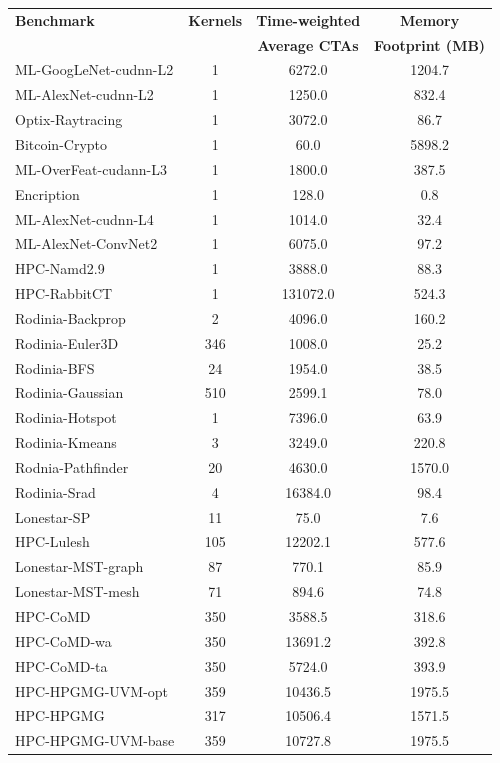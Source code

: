 \begin{table}[tp]
\begin{small}
\centering
\begin{tabular}{lccc}
 \toprule
 \textbf{Benchmark} & \textbf{Kernels} & \textbf{Time-weighted} & \textbf{Memory} \\
& & \textbf{Average CTAs} & \textbf{Footprint (MB)} \\
 \toprule
ML-GoogLeNet-cudnn-L2 & 1 & 6272.0 & 1204.7 \\
ML-AlexNet-cudnn-L2 & 1 & 1250.0 & 832.4 \\
Optix-Raytracing & 1 & 3072.0 & 86.7 \\
Bitcoin-Crypto & 1 & 60.0 & 5898.2 \\
ML-OverFeat-cudann-L3 & 1 & 1800.0 & 387.5 \\
Encription & 1 & 128.0 & 0.8 \\
ML-AlexNet-cudnn-L4 & 1 & 1014.0 & 32.4 \\
ML-AlexNet-ConvNet2 & 1 & 6075.0 & 97.2 \\
HPC-Namd2.9 & 1 & 3888.0 & 88.3 \\
HPC-RabbitCT & 1 & 131072.0 & 524.3 \\
Rodinia-Backprop & 2 & 4096.0 & 160.2 \\
Rodinia-Euler3D & 346 & 1008.0 & 25.2 \\
Rodinia-BFS & 24 & 1954.0 & 38.5 \\
Rodinia-Gaussian & 510 & 2599.1 & 78.0 \\
Rodinia-Hotspot & 1 & 7396.0 & 63.9 \\
Rodinia-Kmeans & 3 & 3249.0 & 220.8 \\
Rodnia-Pathfinder & 20 & 4630.0 & 1570.0 \\
Rodinia-Srad & 4 & 16384.0 & 98.4 \\
Lonestar-SP & 11 & 75.0 & 7.6 \\
HPC-Lulesh & 105 & 12202.1 & 577.6 \\
Lonestar-MST-graph & 87 & 770.1 & 85.9 \\
Lonestar-MST-mesh & 71 & 894.6 & 74.8 \\
HPC-CoMD & 350 & 3588.5 & 318.6 \\
HPC-CoMD-wa & 350 & 13691.2 & 392.8 \\
HPC-CoMD-ta & 350 & 5724.0 & 393.9 \\
HPC-HPGMG-UVM-opt & 359 & 10436.5 & 1975.5 \\
HPC-HPGMG & 317 & 10506.4 & 1571.5 \\
HPC-HPGMG-UVM-base & 359 & 10727.8 & 1975.5 \\

\end{tabular}
\end{small}
\end{table}
